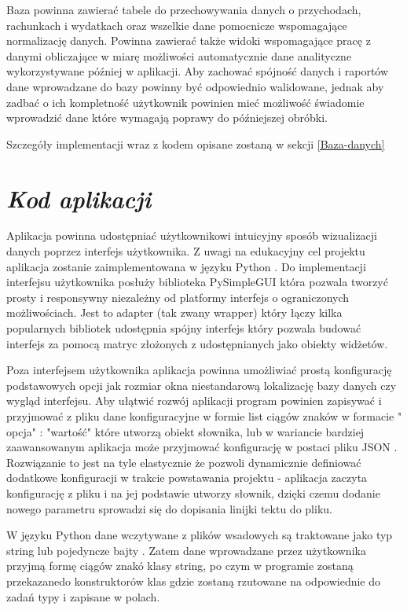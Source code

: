 \documentclass[a4paper,10pt]{report}
\newcommand{\customstylesection}[1]{\textbf{\textit{#1}}}
\begin{document}
{Baza powinna zawierać tabele do przechowywania danych o przychodach, rachunkach
 i wydatkach oraz wszelkie dane pomocnicze wspomagające normalizację danych. 
Powinna zawierać także widoki wspomagające pracę z danymi obliczające w miarę 
możliwości automatycznie dane analityczne wykorzystywane później w aplikacji. 
Aby zachować spójność danych i raportów dane wprowadzane do bazy powinny być 
odpowiednio walidowane, jednak aby zadbać o ich kompletność użytkownik powinien
mieć możliwość świadomie wprowadzić dane które wymagają poprawy do późniejszej 
obróbki.}

{Szczegóły implementacji wraz z kodem opisane zostaną w sekcji \ref{Baza-danych}}

\section{\customstylesection{Kod aplikacji}}
{Aplikacja powinna udostępniać użytkownikowi intuicyjny sposób wizualizacji 
danych poprzez interfejs użytkownika. Z uwagi na edukacyjny cel projektu 
aplikacja zostanie zaimplementowana w języku Python \cite{Python}. Do 
implementacji interfejsu użytkownika posłuży biblioteka PySimpleGUI 
\cite{PySimpleGUI} która pozwala tworzyć prosty i responsywny niezależny od 
platformy interfejs o ograniczonych możliwościach. Jest to adapter 
(tak zwany wrapper) który łączy kilka popularnych bibliotek udostępnia spójny 
interfejs który pozwala budować interfejs za pomocą matryc złożonych z 
udostępnianych jako obiekty widżetów.}

{Poza interfejsem użytkownika aplikacja powinna umożliwiać prostą konfigurację 
podstawowych opcji jak rozmiar okna niestandarową lokalizację bazy danych czy 
wygląd interfejsu. Aby ułątwić rozwój aplikacji program powinien zapisywać i 
przyjmować z pliku dane konfiguracyjne w formie list ciągów znaków w formacie "
opcja" : "wartość" które utworzą obiekt słownika, lub w wariancie bardziej 
zaawansowanym aplikacja może przyjmować konfigurację w postaci pliku JSON 
\cite{JSON}. Rozwiązanie to jest na tyle elastycznie że pozwoli dynamicznie 
definiować dodatkowe konfiguracji w trakcie powstawania projektu - aplikacja 
zaczyta konfigurację z pliku i na jej podstawie utworzy słownik, dzięki czemu 
dodanie nowego parametru sprowadzi się do dopisania linijki tektu do pliku.}

{W języku Python \cite{Python} dane wczytywane z plików wsadowych są traktowane 
jako typ string lub pojedyncze bajty \cite{Python_read-file}. Zatem dane 
wprowadzane przez użytkownika przyjmą formę ciągów znakó klasy string, po czym 
w programie zostaną przekazanedo konstruktorów klas  gdzie zostaną rzutowane na 
odpowiednie do zadań typy i zapisane w polach.}
\end{document}

